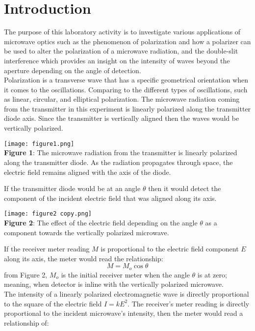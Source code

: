 \documentclass[11pt]{article}
\begin{document}
\section*{Introduction}
The purpose of this laboratory activity is to investigate various applications of microwave optics such as the phenomenon of polarization and how a polarizer can be used to alter the polarization of a microwave radiation, and the double-slit interference which provides an insight on the intensity of waves beyond the aperture depending on the angle of detection.\\
Polarization is a transverse wave that has a specific geometrical orientation when it comes to the oscillations. Comparing to the different types of oscillations, such as linear, circular, and elliptical polarization. The microwave radiation coming from the transmitter in this experiment is linearly polarized along the transmitter diode axis. Since the transmitter is vertically aligned then the waves would be vertically polarized. 
\begin{center}
    \texttt{[image: figure1.png]}\\\textbf{Figure 1}: The microwave radiation from the transmitter is linearly polarized along the transmitter diode. As the radiation propagates through space, the electric field remains aligned with the axis of the diode. 
\end{center}
If the transmitter diode would be at an angle $\theta$ then it would detect the component of the incident electric field that was aligned along its axis.
\begin{center}
    \texttt{[image: figure2 copy.png]}\\\textbf{Figure 2}: The effect of the electric field depending on the angle $\theta$ as a component towards the vertically polarized microwave.
\end{center}
If the receiver meter reading $M$ is proportional to the electric field component $E$ along its axis, the meter would read the relationship:
\begin{equation}
    M=M_o\cos\theta
\end{equation}
 from Figure 2, $M_o$ is the initial receiver meter when the angle $\theta$ is at zero; meaning, when detector is inline with the vertically polarized microwave.\\
The intensity of a linearly polarized electromagnetic wave is directly proportional to the square of the electric field $I=kE^2$. The receiver's meter reading is directly proportional to the incident microwave's intensity, then the meter would read a relationship of:
\end{document}
